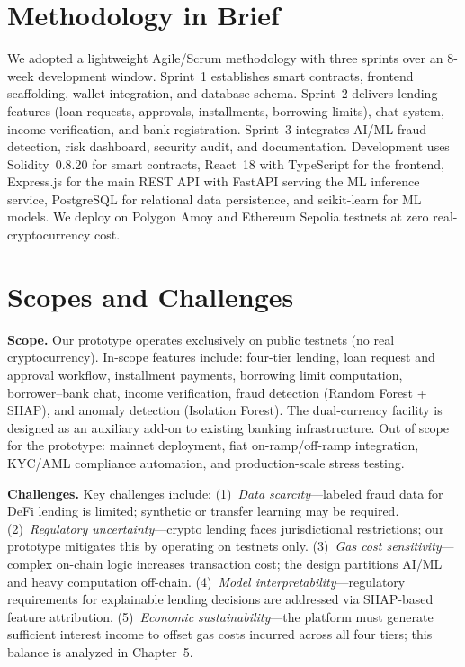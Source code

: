 \documentclass[12pt,a4paper]{report}
\begin{document}
\section{Methodology in Brief}

We adopted a lightweight Agile/Scrum methodology with three sprints over an 8-week development window. Sprint~1 establishes smart contracts, frontend scaffolding, wallet integration, and database schema. Sprint~2 delivers lending features (loan requests, approvals, installments, borrowing limits), chat system, income verification, and bank registration. Sprint~3 integrates AI/ML fraud detection, risk dashboard, security audit, and documentation. Development uses Solidity~0.8.20 for smart contracts, React~18 with TypeScript for the frontend, Express.js for the main REST API with FastAPI serving the ML inference service, PostgreSQL for relational data persistence, and scikit-learn for ML models. We deploy on Polygon Amoy and Ethereum Sepolia testnets at zero real-cryptocurrency cost.

\section{Scopes and Challenges}

\textbf{Scope.} Our prototype operates exclusively on public testnets (no real cryptocurrency). In-scope features include: four-tier lending, loan request and approval workflow, installment payments, borrowing limit computation, borrower--bank chat, income verification, fraud detection (Random Forest + SHAP), and anomaly detection (Isolation Forest). The dual-currency facility is designed as an auxiliary add-on to existing banking infrastructure. Out of scope for the prototype: mainnet deployment, fiat on-ramp/off-ramp integration, KYC/AML compliance automation, and production-scale stress testing.

\textbf{Challenges.} Key challenges include: (1)~\textit{Data scarcity}---labeled fraud data for DeFi lending is limited; synthetic or transfer learning may be required. (2)~\textit{Regulatory uncertainty}---crypto lending faces jurisdictional restrictions; our prototype mitigates this by operating on testnets only. (3)~\textit{Gas cost sensitivity}---complex on-chain logic increases transaction cost; the design partitions AI/ML and heavy computation off-chain. (4)~\textit{Model interpretability}---regulatory requirements for explainable lending decisions are addressed via SHAP-based feature attribution. (5)~\textit{Economic sustainability}---the platform must generate sufficient interest income to offset gas costs incurred across all four tiers; this balance is analyzed in Chapter~5.
\end{document}
